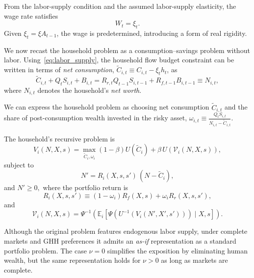 From the labor-supply condition and the assumed labor-supply elasticity, the wage rate
satisfies
\begin{equation}
W_t = \xi_t.
\label{eq:labor_supply}
\end{equation}
Given $\xi_t = \xi A_{t-1}$, the wage is predetermined, introducing a form of real
rigidity.

We now recast the household problem as a consumption--savings problem without labor.
Using~\eqref{eq:labor_supply}, the household flow budget constraint can be written in
terms of \emph{net consumption},
$\tilde C_{i,t} \equiv C_{i,t}-\xi_t h_t$, as
\begin{equation}
\tilde C_{i,t}
+ Q_t S_{i,t}
+ B_{i,t}
=
R_{r,t} Q_{t-1} S_{i,t-1}
+ R_{f,t-1} B_{i,t-1}
\equiv N_{i,t},
\label{eq:modified_budget}
\end{equation}
where $N_{i,t}$ denotes the household's \emph{net worth}.

We can express the household problem as choosing net consumption $\tilde C_{i,t}$ and the share of post-consumption
wealth invested in the risky asset, $\omega_{i,t}
\equiv
\frac{Q_t S_{i,t}}{N_{i,t}-\tilde C_{i,t}}.$

\begin{problem}\label{eq:recursive_representation}
The household's recursive problem is
\begin{equation}
V_i(N,X,s)
=
\max_{\tilde C_i,\omega_i}
(1-\beta)U(\tilde C_i)
+
\beta\,U\!\left(\mathcal V_i(N,X,s)\right),
\label{eq: inv_recursive_problem}
\end{equation}
subject to
\begin{equation}
N'
=
R_{i}(X,s,s')\,(N-\tilde C_i),
\label{eq:lom_N}
\end{equation}
and $N'\ge 0,$ where the portfolio return is
\begin{equation}
R_{i}(X,s,s')
\equiv
(1-\omega_i)R_f(X,s)
+
\omega_i R_r(X,s,s'),
\end{equation}
and
\[
\mathcal V_i(N,X,s)
=
\Psi^{-1}\!\left(
\mathbb E_i\!\left[
\Psi\!\left(U^{-1}(V_i(N',X',s'))\right)
\mid X,s
\right]
\right).
\]
\end{problem}

Although the original problem features endogenous labor supply, under complete markets
and GHH preferences it admits an \emph{as-if} representation as a standard portfolio
problem. The case $\nu=0$ simplifies the exposition by eliminating human wealth, but the
same representation holds for $\nu>0$ as long as markets are complete.


